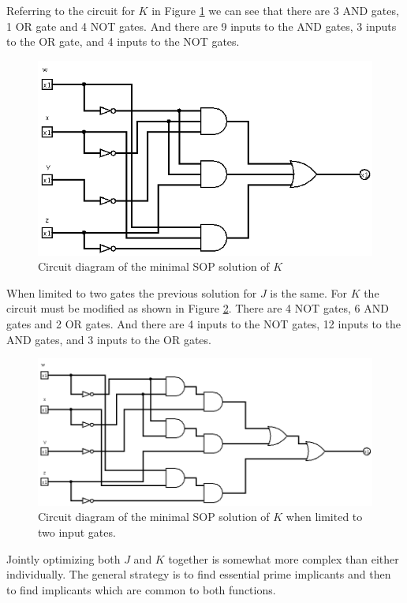 \documentclass[12pt]{article}
\begin{document}
Referring to the circuit for $K$ in Figure \ref{fig:Kminsop-01} we
can see that there are 3 AND gates, 1 OR gate and 4 NOT gates.
And there are 9 inputs to the AND gates, 3 inputs to the OR gate,
and 4 inputs to the NOT gates.

\begin{figure}[!htb]
\center
\includegraphics[scale=0.5]{Kminsop-01}
\caption{Circuit diagram of the minimal SOP solution of $K$}
\label{fig:Kminsop-01}
\end{figure}

When limited to two gates the previous solution for $J$ is the
same.
For $K$ the circuit must be modified as shown in Figure \ref{fig:Kminsop-02}.
There are 4 NOT gates, 6 AND gates and 2 OR gates.
And there are 4 inputs to the NOT gates, 12 inputs to the AND gates,
and 3 inputs to the OR gates.

\begin{figure}[!htb]
\center
\includegraphics[scale=0.5]{Kminsop-02}
\caption{Circuit diagram of the minimal SOP solution of $K$ when limited to two input gates.}
\label{fig:Kminsop-02}
\end{figure}

\clearpage

Jointly optimizing both $J$ and $K$ together is somewhat more complex than
either individually.
The general strategy is to find essential prime implicants and then to find
implicants which are common to both functions.
\end{document}
